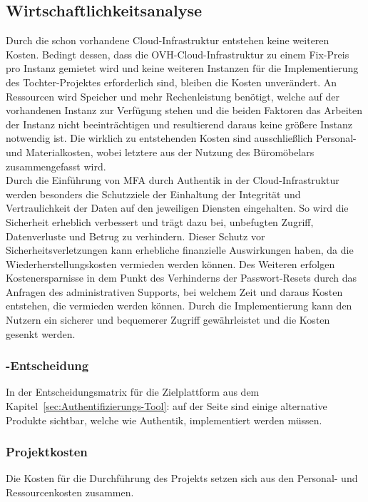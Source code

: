 \subsection{Wirtschaftlichkeitsanalyse}
\label{sec:Wirtschaftlichkeitsanalyse}
Durch die schon vorhandene Cloud-Infrastruktur entstehen keine weiteren Kosten. Bedingt dessen, dass die 
OVH-Cloud-Infrastruktur zu einem Fix-Preis pro Instanz gemietet wird und keine weiteren Instanzen für die Implementierung 
des Tochter-Projektes erforderlich sind, bleiben die Kosten unverändert. An Ressourcen wird Speicher und mehr 
Rechenleistung benötigt, welche auf der vorhandenen Instanz zur Verfügung stehen und die beiden Faktoren das Arbeiten 
der Instanz nicht beeinträchtigen und resultierend daraus keine größere Instanz notwendig ist. Die wirklich zu entstehenden 
Kosten sind ausschließlich Personal- und Materialkosten, wobei letztere aus der Nutzung des Büromöbelars zusammengefasst wird. 
\\Durch die Einführung von \acs*{MFA} durch Authentik in der Cloud-Infrastruktur werden besonders die Schutzziele der 
Einhaltung der Integrität und Vertraulichkeit der Daten auf den jeweiligen Diensten eingehalten. So wird die Sicherheit 
erheblich verbessert und trägt dazu bei, unbefugten Zugriff, Datenverluste und Betrug zu verhindern. Dieser Schutz 
vor Sicherheitsverletzungen kann erhebliche finanzielle Auswirkungen haben, da die Wiederherstellungskosten vermieden 
werden können. Des Weiteren erfolgen Kostenersparnisse in dem Punkt des Verhinderns der Passwort-Resets durch das Anfragen des 
administrativen Supports, bei welchem Zeit und daraus Kosten entstehen, die vermieden werden können. Durch die Implementierung 
kann den Nutzern ein sicherer und bequemerer Zugriff gewährleistet und die Kosten gesenkt werden.


\subsubsection{-Entscheidung}
\label{sec:MakeOrBuyEntscheidung}
In der Entscheidungsmatrix für die Zielplattform aus dem Kapitel~\ref{sec:Authentifizierungs-Tool}: 
auf der Seite \pageref{sec:Authentifizierungs-Tool} sind einige alternative Produkte sichtbar, welche wie Authentik, 
implementiert werden müssen.


\subsubsection{Projektkosten}
\label{sec:Projektkosten}
Die Kosten für die Durchführung des Projekts setzen sich aus den Personal- und Ressourcenkosten zusammen.   


